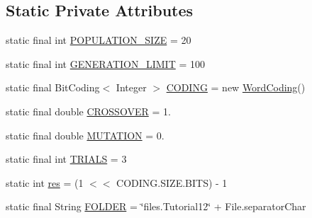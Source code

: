 \subsection*{Static Private Attributes}
\begin{DoxyCompactItemize}
\item 
static final int \hyperlink{classjenes_1_1tutorials_1_1problem12_1_1_multi_objective_problem_a6c1f7434decfa5a4fb9a76e1a97c2c02}{P\-O\-P\-U\-L\-A\-T\-I\-O\-N\-\_\-\-S\-I\-Z\-E} = 20
\item 
static final int \hyperlink{classjenes_1_1tutorials_1_1problem12_1_1_multi_objective_problem_ad85a0fa5185c23b4fa853dc776c6ea71}{G\-E\-N\-E\-R\-A\-T\-I\-O\-N\-\_\-\-L\-I\-M\-I\-T} = 100
\item 
static final Bit\-Coding$<$ Integer $>$ \hyperlink{classjenes_1_1tutorials_1_1problem12_1_1_multi_objective_problem_a229f3efba809f6a257ee0594c2825a73}{C\-O\-D\-I\-N\-G} = new \hyperlink{classjenes_1_1chromosome_1_1codings_1_1_word_coding}{Word\-Coding}()
\item 
static final double \hyperlink{classjenes_1_1tutorials_1_1problem12_1_1_multi_objective_problem_afaa7b7bfaaab60aa9d39be734a103044}{C\-R\-O\-S\-S\-O\-V\-E\-R} = 1.
\item 
static final double \hyperlink{classjenes_1_1tutorials_1_1problem12_1_1_multi_objective_problem_aaadbf1328672fc4f215abc3bc78a90dd}{M\-U\-T\-A\-T\-I\-O\-N} = 0.
\item 
static final int \hyperlink{classjenes_1_1tutorials_1_1problem12_1_1_multi_objective_problem_a3afefd11959f65c25c815b134439d091}{T\-R\-I\-A\-L\-S} = 3
\item 
static int \hyperlink{classjenes_1_1tutorials_1_1problem12_1_1_multi_objective_problem_ad61d16088d49c82c9e1a18619777ace8}{res} = (1 $<$$<$ C\-O\-D\-I\-N\-G.\-S\-I\-Z\-E.\-B\-I\-T\-S) -\/ 1
\item 
static final String \hyperlink{classjenes_1_1tutorials_1_1problem12_1_1_multi_objective_problem_a08abe3cd9cc901dffb204a567a46ecd6}{F\-O\-L\-D\-E\-R} = \char`\"{}files.\-Tutorial12\char`\"{} + File.\-separator\-Char
\end{DoxyCompactItemize}


